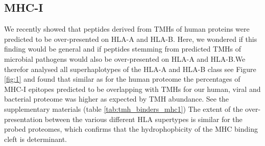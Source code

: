 \subsection{MHC-I}

We recently showed that peptides derived from TMHs of human proteins 
were predicted to be over-presented on HLA-A and HLA-B. 
Here, we wondered if this finding would be general 
and if peptides stemming from predicted TMHs of microbial pathogens 
would also be over-presented on HLA-A and HLA-B.We therefor analysed all superhaplotypes of the HLA-A and HLA-B class see Figure \ref{fig:1} and found that similar as for the human proteome the percentages of MHC-I epitopes predicted to be overlapping with TMHs for our human, viral and bacterial proteome was higher as expected by TMH abundance.
See the supplementary materials (table \ref{tab:tmh_binders_mhc1}) 
The extent of the over-presentation between the various different HLA supertypes is similar for the probed proteomes, which confirms that the hydrophopbicity of the MHC binding cleft is determinant.  

